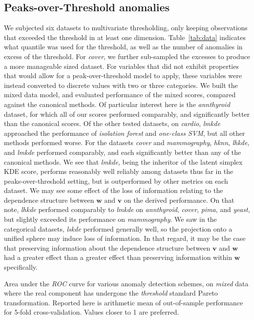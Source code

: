 \subsection{Peaks-over-Threshold anomalies}
We subjected six datasets to multivariate thresholding, only keeping 
    observations that exceeded the threshold in at least one dimension.  
    Table~\ref{tab:data} indicates what quantile was used for the threshold, as
    well as the number of anomalies in excess of the threshold.
    For \emph{cover}, we further sub-sampled the excesses to produce a 
    more manageable sized dataset.  For variables that did not exhibit 
    properties that would allow for a peak-over-threshold model to 
    apply, these variables were instead converted to discrete values with two 
    or three categories.  We built the mixed data model, and evaluated 
    performance of the mixed scores, compared against the canonical methods.  
    Of particular interest here is the \emph{annthyroid} dataset, for which all 
    of our scores performed comparably, and significantly better than the 
    canonical scores.  Of the other tested datasets, on \emph{cardio}, 
    \emph{lmkde} approached the performance of \emph{isolation forest} and 
    \emph{one-class SVM}, but all other methods performed worse.  For the 
    datasets \emph{cover} and \emph{mammography}, \emph{hknn}, \emph{lhkde}, 
    and \emph{lmkde} performed comparably, and each significantly better than 
    any of the canonical methods.  We see that \emph{lmkde}, being the inheritor
    of the latent simplex KDE score, performs reasonably well reliably among 
    datasets thus far in the peaks-over-threshold setting, but is outperformed 
    by other metrics on each dataset. We may see some effect of the loss of 
    information relating to the dependence structure between $\bm{w}$ and 
    $\bm{v}$ on the derived performance.  On that note, \emph{lhkde} performed 
    comparably to \emph{lmkde} on \emph{annthyroid}, \emph{cover}, \emph{pima}, 
    and \emph{yeast}, but slightly exceeded its performance on 
    \emph{mammography}.  We saw in the categorical datasets, \emph{lskde} 
    performed generally well, so the projection onto a unified sphere may 
    induce loss of information.  In that regard, it may be the case that 
    preserving information about the dependence structure between $\bm{v}$ and 
    $\bm{w}$ had a greater effect than a greater effect than preserving 
    information within $\bm{w}$ specifically.
    
\begin{table}[ht]
    \centering
    \caption{Area under the \emph{ROC} curve for various anomaly detection 
        schemes, on \emph{mixed} data where the real component has undergone 
        the \emph{threshold} standard Pareto transformation.   Reported here is 
        arithmetic mean of out-of-sample performance for 5-fold 
        cross-validation.  Values closer to 1 are preferred.
        \label{tab:perfreal}}
    \bigskip
    \small
    
\end{table}

